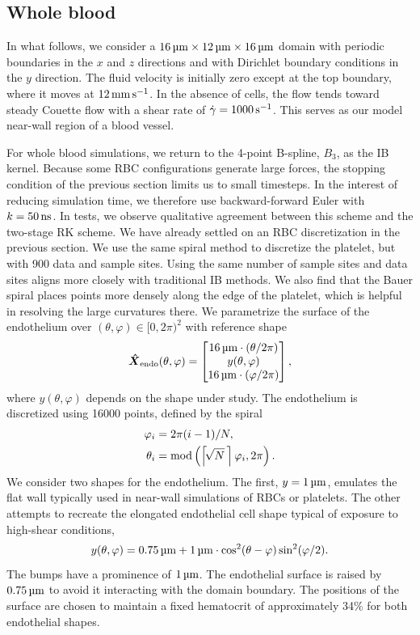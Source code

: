 \subsection{Whole blood}\label{sec:whole-blood}

In what follows, we consider a $16\um\times12\um\times16\um$ domain with periodic boundaries in the $x$ and $z$
directions and with Dirichlet boundary conditions in the $y$ direction. The fluid velocity is initially zero
except at the top boundary, where it moves at $12\mmpersec$. In the absence of cells, the flow tends toward steady
Couette flow with a shear rate of $\shear=1000\persec$. This serves as our model near-wall region of a blood
vessel.

For whole blood simulations, we return to the 4-point B-spline, $B_3$, as the IB kernel.  Because some RBC
configurations generate large forces, the stopping condition of the previous section limits us to small timesteps.
In the interest of reducing simulation time, we therefore use backward-forward Euler with $\timestep=50\ns$. In
tests, we observe qualitative agreement between this scheme and the two-stage RK scheme. We have already settled
on an RBC discretization in the previous section. We use the same spiral method to discretize the platelet, but
with 900 data and sample sites. Using the same number of sample sites and data sites aligns more closely with
traditional IB methods. We also find that the Bauer spiral places points more densely along the edge of the
platelet, which is helpful in resolving the large curvatures there. We parametrize the surface of the endothelium
over $(\theta, \varphi)\in{[0, 2\pi)}^2$ with reference shape
\begin{equation}
    \vec{\hat{X}}_\text{endo}(\theta, \varphi) = \begin{bmatrix}
            16\um\cdot(\theta/2\pi)  \\
            y(\theta, \varphi) \\
            16\um\cdot(\varphi/2\pi)
    \end{bmatrix},
\end{equation}
where $y(\theta, \varphi)$ depends on the shape under study. The endothelium is discretized using 16000 points,
defined by the spiral
\begin{align*}
    \varphi_i &= 2\pi (i-1)/N, \\
    \theta_i &= \modulo\left(\left\lceil\!\sqrt{N}\mskip\thinmuskip\right\rceil\varphi_i, 2\pi\right).
\end{align*}
We consider two shapes for the endothelium. The first, $y=1\um$, emulates the flat wall typically used in
near-wall simulations of RBCs or platelets. The other attempts to recreate the elongated endothelial cell shape
typical of exposure to high-shear conditions,
\begin{equation*}
    y(\theta, \varphi) = 0.75\um + 1\um\cdot\cos^2(\theta-\varphi)\sin^2(\varphi/2).
\end{equation*}
The bumps have a prominence of $1\um$. The endothelial surface is raised by $0.75\um$ to avoid it interacting with
the domain boundary. The positions of the surface are chosen to maintain a fixed hematocrit of approximately 34\%
for both endothelial shapes.

